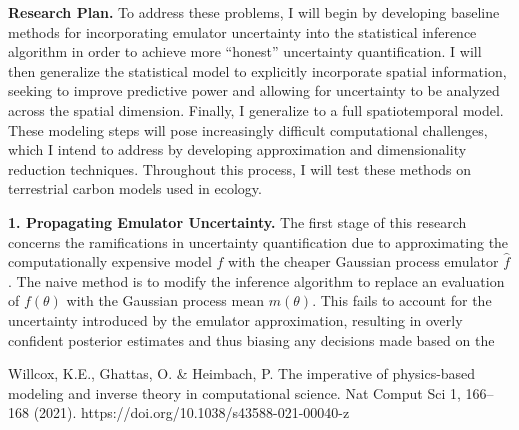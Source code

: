 \documentclass[12pt]{article}
\begin{document}
\noindent
\textbf{Research Plan.} To address these problems, I will begin by developing baseline methods for incorporating emulator uncertainty into the statistical inference algorithm in order to achieve more ``honest''
uncertainty quantification. I will then generalize the statistical model to explicitly incorporate spatial information, seeking to improve predictive power and allowing for uncertainty to be analyzed across
the spatial dimension. Finally, I generalize to a full spatiotemporal model. These modeling steps will pose increasingly difficult computational challenges, which I intend to address by developing 
approximation and dimensionality reduction techniques. Throughout this process, I will test these methods on terrestrial carbon models used in ecology. 
 
 \textbf{1. Propagating Emulator Uncertainty.} The first stage of this research concerns the ramifications in uncertainty quantification due to approximating the computationally expensive model $f$ with the 
 cheaper Gaussian process emulator $\hat{f}$. The naive method is to modify the inference algorithm to replace an evaluation of $f(\theta)$ with the Gaussian process mean $m(\theta)$. This fails to account
 for the uncertainty introduced by the emulator approximation, resulting in overly confident posterior estimates and thus biasing any decisions made based on the 
 
 



\begin{thebibliography}{20}
 Willcox, K.E., Ghattas, O. \& Heimbach, P. The imperative of physics-based modeling and inverse theory in computational science. Nat Comput Sci 1, 166–168 (2021). https://doi.org/10.1038/s43588-021-00040-z
\end{thebibliography}
\end{document}
